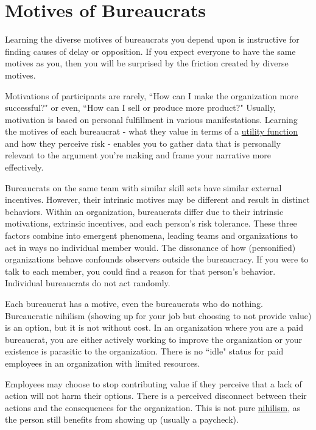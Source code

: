 \section{Motives of Bureaucrats\label{sec:motivations}}

Learning the diverse motives of bureaucrats you depend upon is instructive for finding causes of delay or opposition. If you expect everyone to have the same motives as you, then you will be surprised by the friction created by diverse motives. 

Motivations of participants are rarely, ``How can I make the organization more successful?" or even, ``How can I sell or produce more product?" Usually, motivation is based on personal fulfillment in various manifestations. Learning the motives of each bureaucrat - what they value in terms of a \href{https://en.wikipedia.org/wiki/Utility}{utility function}
and how they perceive risk - enables you to gather data that is personally relevant to the argument you're making and frame your narrative more effectively.


Bureaucrats on the same team with similar skill sets have similar external incentives. However, their intrinsic motives may be different and result in distinct behaviors. Within an organization, bureaucrats differ due to their intrinsic motivations,  extrinsic incentives, and each person's risk tolerance. These three factors combine into emergent phenomena, leading teams and organizations to act in ways no individual member would. The dissonance of how (personified) organizations behave confounds observers outside the bureaucracy. If you were to talk to each member, you could find a reason for that person's behavior. Individual bureaucrats do not act randomly.



Each bureaucrat has a motive, even the bureaucrats who do nothing. Bureaucratic nihilism (showing up for your job but choosing to not provide value) is an option, but it is not without cost.
In an organization where you are a paid bureaucrat, you are either actively working to improve the organization or your existence is parasitic to the organization. There is no ``idle" status for paid employees in an organization with limited resources.

Employees may choose to stop contributing value if they perceive that a lack of action will not harm their options. There is a perceived disconnect between their actions and the consequences for the organization. This is not pure \href{https://en.wikipedia.org/wiki/Nihilism}{nihilism}, 
as the person still  benefits from showing up (usually a paycheck).

